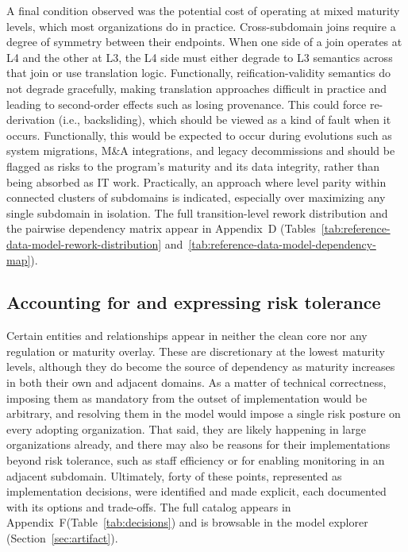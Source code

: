\documentclass[10pt,letterpaper,twocolumn,twoside]{rho-class/rho}
\begin{document}
A final condition observed was the potential cost of operating at mixed maturity levels, which most organizations do in practice. Cross-subdomain joins require a degree of symmetry between their endpoints. When one side of a join operates at L4 and the other at L3, the L4 side must either degrade to L3 semantics across that join or use translation logic. Functionally, reification-validity semantics do not degrade gracefully, making translation approaches difficult in practice and leading to second-order effects such as losing provenance. This could force re-derivation (i.e., backsliding), which should be viewed as a kind of fault when it occurs. Functionally, this would be expected to occur during evolutions such as system migrations, M\&A integrations, and legacy decommissions and should be flagged as risks to the program's maturity and its data integrity, rather than being absorbed as IT work. Practically, an approach where level parity within connected clusters of subdomains is indicated, especially over maximizing any single subdomain in isolation. The full transition-level rework distribution and the pairwise dependency matrix appear in Appendix~D (Tables~\ref{tab:reference-data-model-rework-distribution} and~\ref{tab:reference-data-model-dependency-map}).

\subsection{Accounting for and expressing risk tolerance}\label{sec:risk}

Certain entities and relationships appear in neither the clean core nor any regulation or maturity overlay. These are discretionary at the lowest maturity levels, although they do become the source of dependency as maturity increases in both their own and adjacent domains. As a matter of technical correctness, imposing them as mandatory from the outset of implementation would be arbitrary, and resolving them in the model would impose a single risk posture on every adopting organization. That said, they are likely happening in large organizations already, and there may also be reasons for their implementations beyond risk tolerance, such as staff efficiency or for enabling monitoring in an adjacent subdomain. Ultimately, forty of these points, represented as implementation decisions,
were identified and made explicit, each documented with its options and
trade-offs. The full catalog appears in Appendix~F(Table~\ref{tab:decisions}) and is browsable in the model explorer (Section~\ref{sec:artifact}).
\end{document}
